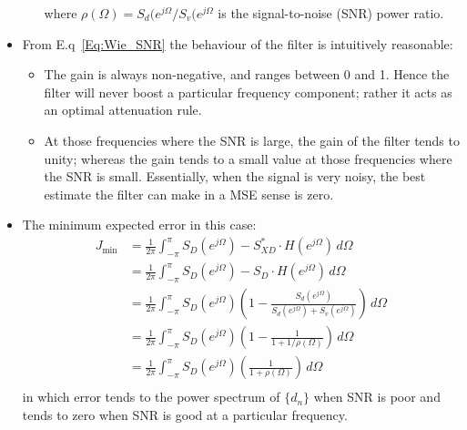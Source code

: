 \documentclass[12pt]{article}
\newcommand{\intpipi}{\int_{-\pi}^{\pi}}
\newcommand{\proc}[1]{\{ #1_n\}}
\begin{document}
\begin{itemize}
\begin{enumerate}
        where $\rho(\Omega) = S_d(e^{j\Omega} / S_v(e^{j\Omega}$ is the signal-to-noise (SNR) power ratio. 
    \end{enumerate}
    \item From E.q~\ref{Eq:Wie_SNR} the behaviour of the filter is intuitively reasonable:
    \begin{itemize}
        \item The gain is always non-negative, and ranges between 0 and 1. Hence the filter will never boost a particular frequency component; rather it acts as an optimal attenuation rule.
        \item At those frequencies where the SNR is large, the gain of the filter tends to unity; whereas the gain tends to a small value at those frequencies where the SNR is small. Essentially, when the signal is very noisy, the best estimate the filter can make in a MSE sense is zero.
    \end{itemize}
    \item The minimum expected error in this case:
    \begin{align*}
        J_{\min} &= \frac{1}{2\pi}\intpipi S_D(e^{j\Omega}) - S_{XD}^* \cdot H(e^{j\Omega})\, d\Omega \\
        &= \frac{1}{2\pi}\intpipi S_D(e^{j\Omega}) - S_{D} \cdot H(e^{j\Omega})\, d\Omega \\
        &= \frac{1}{2\pi}\intpipi S_D(e^{j\Omega})\left(1 -\frac{S_d(e^{j\Omega})}{S_d(e^{j\Omega}) + S_v(e^{j\Omega})} \right)  \, d\Omega \\
        &= \frac{1}{2\pi}\intpipi S_D(e^{j\Omega})\left(1 - \frac{1}{1 + 1/\rho(\Omega)} \right)  \, d\Omega \\
        &= \frac{1}{2\pi}\intpipi S_D(e^{j\Omega})\left(\frac{1}{1+\rho(\Omega)} \right)  \, d\Omega \\
    \end{align*}
    in which error tends to the power spectrum of $\proc{d}$ when SNR is poor and tends to zero when SNR is good at a particular frequency.
\end{itemize}
\end{document}
